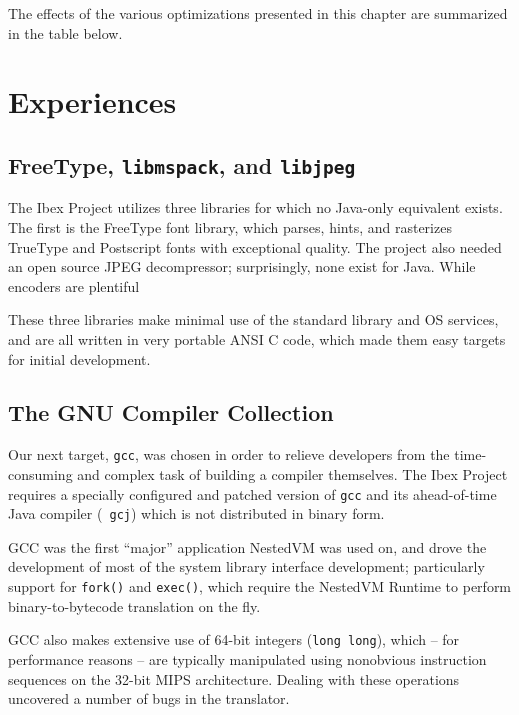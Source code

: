 \documentclass{acmconf}
\begin{document}
The effects of the various optimizations presented in this chapter are
summarized in the table below.



\section{Experiences}

\subsection{FreeType, {\tt libmspack}, and {\tt libjpeg}}

The Ibex Project utilizes three libraries for which no Java-only
equivalent exists.  The first is the FreeType font library, which
parses, hints, and rasterizes TrueType and Postscript fonts with
exceptional quality.  The project also needed an open source JPEG
decompressor; surprisingly, none exist for Java.  While encoders are
plentiful

These three libraries make minimal use of the standard library and OS
services, and are all written in very portable ANSI C code, which made
them easy targets for initial development.

\subsection{The GNU Compiler Collection}

Our next target, {\tt gcc}, was chosen in order to relieve developers
from the time-consuming and complex task of building a compiler
themselves.  The Ibex Project requires a specially configured and
patched version of {\tt gcc} and its ahead-of-time Java compiler ({\tt
gcj}) which is not distributed in binary form.

GCC was the first ``major'' application NestedVM was used on, and
drove the development of most of the system library interface
development; particularly support for {\tt fork()} and {\tt exec()},
which require the NestedVM Runtime to perform binary-to-bytecode
translation on the fly.

GCC also makes extensive use of 64-bit integers ({\tt long long}),
which -- for performance reasons -- are typically manipulated using
nonobvious instruction sequences on the 32-bit MIPS architecture.
Dealing with these operations uncovered a number of bugs in the
translator.
\end{document}
